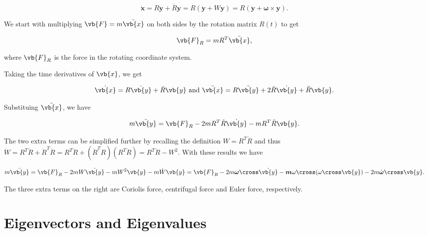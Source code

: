 \documentclass[a4paper,12pt]{report}
\begin{document}
\begin{equation}
\dot{\mathbf{x}} = R \dot{\mathbf{y}} + \dot{R} \mathbf{y} = R (\dot{\mathbf{y}} + W \mathbf{y}) = R (\dot{\mathbf{y}} + \boldsymbol{\omega} \times \mathbf{y}) .
\end{equation}

We start with multiplying \(\vb{F} = m \ddot{\vb{x} } \) on both sides by the rotation matrix \(R(t)\) to get

\begin{equation}
    \vb{F} _{R} = mR^{T}\ddot{\vb{x} },   
\end{equation}

where \(\vb{F} _{R} \) is the force in the rotating coordinate system.

Taking the time derivatives of \(\vb{x} \), we get 

\begin{equation}
    \dot{\vb{x} } = R \dot{\vb{y} } + \dot{R} \vb{y} \text { and } \ddot{\vb{x} } = R \ddot{\vb{y} } + 2\dot{R} \dot{\vb{y} } + \ddot{R} \vb{y} .   
\end{equation}

Substituing \(\ddot{\vb{x} } \), we have

\begin{equation}
    m \ddot{\vb{y} } = \vb{F} _{R} - 2mR^{T}\dot{R} \dot{\vb{y} } - mR^{T} \ddot{R} \vb{y} .      
\end{equation}

The two extra terms can be simplified further by recalling the definition \(W = R^{T}\dot{R}  \) and thus \(\dot{W} = R^{T} \ddot{R} + \dot{R} ^{T} \dot{R} = R^{T}\ddot{R} + (\dot{R} ^{T}R )(R^{T}\dot{R}  ) = R^{T}\ddot{R} - W^2      \). With these results we have

\begin{equation}
    m \ddot{\vb{y} }  = \vb{F} _{R} - 2mW \dot{\vb{y} } - mW^2 \vb{y}  - m \dot{W} \vb{y} = \vb{F} _{R} - 2m \boldsymbol{\omega }\cross \dot{\vb{y} } - \boldsymbol{m} \omega \cross (\omega \cross \vb{y} ) - 2m \dot{\boldsymbol{\omega } }\cross \vb{y} .       
\end{equation}

The three extra terms on the right are Coriolis force, centrifugal force and Euler force, respectively.

\chapter{Eigenvectors and Eigenvalues}
\end{document}
